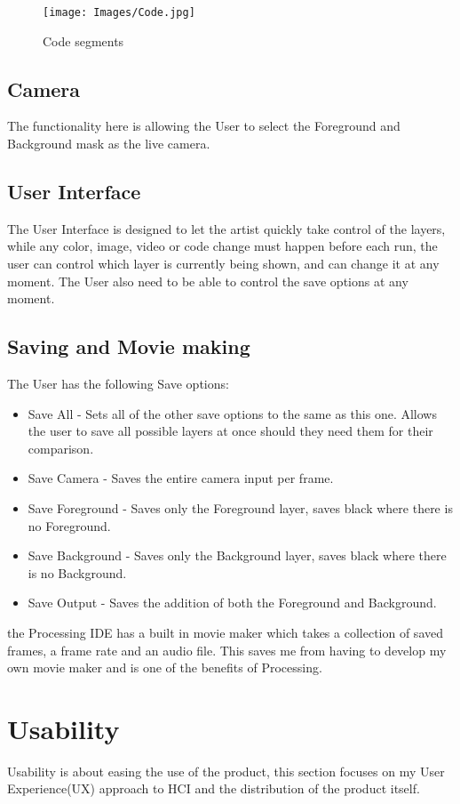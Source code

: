 \documentclass[a4paper]{report}
\begin{document}
\begin{figure}[!ht]
\centering
\texttt{[image: Images/Code.jpg]}
\caption{\label{fig:Doughnut} Code segments}
\end{figure}

\subsection{Camera}
The functionality here is allowing the User to select the Foreground and Background mask as the live camera.

\subsection{User Interface}
The User Interface is designed to let the artist quickly take control of the layers, while any color, image, video or code change must happen before each run, the user can control which layer is currently being shown, and can change it at any moment. The User also need to be able to control the save options at any moment.

\subsection{Saving and Movie making}
The User has the following Save options:

\begin{itemize}
\item Save All - Sets all of the other save options to the same as this one. Allows the user to save all possible layers at once should they need them for their comparison.
\item Save Camera - Saves the entire camera input per frame.
\item Save Foreground - Saves only the Foreground layer, saves black where there is no Foreground.
\item Save Background - Saves only the Background layer, saves black where there is no Background.
\item Save Output - Saves the addition of both the Foreground and Background.
\end{itemize}

the Processing IDE\cite{PROCESSING} has a built in movie maker which takes a collection of saved frames, a frame rate and an audio file. This saves me from having to develop my own movie maker and is one of the benefits of Processing.

\section{Usability}
Usability is about easing the use of the product, this section focuses on my User Experience(UX) approach to HCI and the distribution of the product itself.
\end{document}
